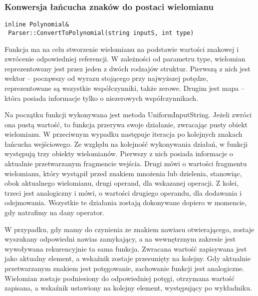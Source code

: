 \subsubsection{Konwersja łańcucha znaków do postaci wielomianu}
\begin{lstlisting}
inline Polynomial&
 Parser::ConvertToPolynomial(string inputS, int type)
\end{lstlisting}

Funkcja ma na celu stworzenie wielomianu na podstawie wartości znakowej i zwrócenie odpowiedniej referencji. W zależności od parametru type, wielomian reprezentowany jest przez jeden z dwóch rodzajów struktur. Pierwszą z nich jest wektor -- począwszy od wyrazu stojącego przy najwyższej potędze, reprezentowane są wszystkie współczynniki, także zerowe. Drugim jest mapa -- która posiada informacje tylko o niezerowych współczynnikach.

Na początku funkcji wykonywana jest metoda UniformInputString. Jeżeli zwróci ona pustą wartość, to funkcja przerywa swoje działanie, zwracając pusty obiekt wielomianu. W przeciwnym wypadku następuje iteracja po kolejnych znakach łańcucha wejściowego. Ze względu na kolejność wykonywania działań, w funkcji występują trzy obiekty wielomianów. Pierwszy z nich posiada informacje o aktualnie przetwarzanym fragmencie wejścia. Drugi mówi o wartości fragmentu wielomianu, który wystąpił przed znakiem mnożenia lub dzielenia, stanowiąc, obok aktualnego wielomianu, drugi operand, dla wskazanej operacji. Z kolei, trzeci jest analogiczny i mówi, o wartości drugiego operandu, dla dodawania i odejmowania. Wszystkie te działania zostają dokonywane dopiero w momencie, gdy natrafimy na dany operator.

W przypadku, gdy mamy do czynienia ze znakiem nawiasu otwierającego, zostaje wyszukany odpowiedni nawias zamykający, a na wewnętrznym zakresie jest wywoływana rekurencyjnie ta sama funkcja. Zwracana wartość zapisywana jest jako aktualny element, a wskaźnik zostaje przesunięty na kolejny. Gdy aktualnie przetwarzanym znakiem jest potęgowanie, zachowanie funkcji jest analogiczne. Wielomian zostaje podniesiony do odpowiedniej potęgi, otrzymana wartość zapisana, a wskaźnik ustawiony na kolejny element, występujący po wykładniku.

